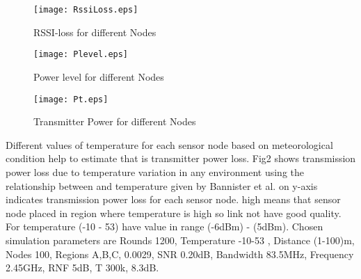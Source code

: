 \documentclass{article}
\begin{document}
\begin{figure}[h]
\begin{center}
\texttt{[image: RssiLoss.eps]}
\vspace{-0.5cm}
\caption{RSSI-loss for different Nodes}
\end{center}
\end{figure}

\begin{figure}[h]
\begin{center}
\texttt{[image: Plevel.eps]}
\vspace{-0.5cm}
\caption{Power level for different Nodes}
\end{center}
\end{figure}

\begin{figure}[h]
\begin{center}
\texttt{[image: Pt.eps]}
\vspace{-0.5cm}
\caption{Transmitter Power for different Nodes}
\end{center}
\end{figure}

Different values of temperature for each sensor node based on meteorological condition  help to estimate  that is transmitter power loss. Fig2 shows transmission power loss due to temperature variation in any environment using the relationship between  and temperature  given by Bannister et al.   on y-axis indicates transmission power loss for each  sensor node.  high means that sensor node  placed in region where temperature is high so link not have good quality. For temperature (-10 - 53)   have value in range (-6dBm) - (5dBm). Chosen simulation parameters are Rounds 1200, Temperature -10-53 , Distance (1-100)m, Nodes 100, Regions A,B,C,  0.0029, SNR 0.20dB, Bandwidth 83.5MHz, Frequency 2.45GHz, RNF 5dB, T 300k,   8.3dB.
\end{document}
